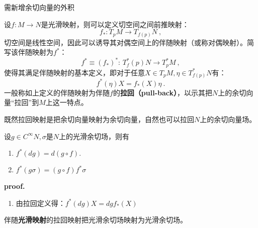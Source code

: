 
\begin{issues}
\issueDraft 需新增余切向量的外积
\end{issues}

设$f:M\rightarrow N$是光滑映射，则可以定义切空间之间前推映射：
\begin{equation}
f_*: T_p M\rightarrow T_{f(p)}N~,
\end{equation}
切空间是线性空间，因此可以诱导其对偶空间上的伴随映射（或称对偶映射）。简写该伴随映射为$f^*$：
\begin{equation}
f^*\equiv(f_*)^*:\,T^*_f(p)N\rightarrow T_p^*M~,
\end{equation}
使得其满足伴随映射的基本定义，即对于任意$X\in T_p M,\eta\in T^*_{f(p)}N$有：
\begin{equation}
f^*(\eta)X=f_*(X)\eta~.
\end{equation}
一般称如上定义的伴随映射为伴随$f$的\textbf{拉回（pull-back）}，以示其把$N$上的余切向量“拉回”到$M$上这一特点。

既然拉回映射是把余切向量映射为余切向量，自然也可以拉回$N$上的余切向量场。
\begin{lemma}{}
设$g\in C^{\infty }N,\sigma$是$N$上的光滑余切场，则有
\begin{enumerate}
\item $f^*(dg)=d(g\circ f).$
\item $f^*(g\sigma)=(g\circ f)f^*\sigma$
\end{enumerate}
\end{lemma}
\textbf{proof.}
\begin{enumerate}
\item 由拉回定义得：$f^*(dg)X=dgf_*(X)$
\end{enumerate}

\begin{theorem}{}
伴随\textbf{光滑映射}的拉回映射把光滑余切场映射为光滑余切场。
\end{theorem}
